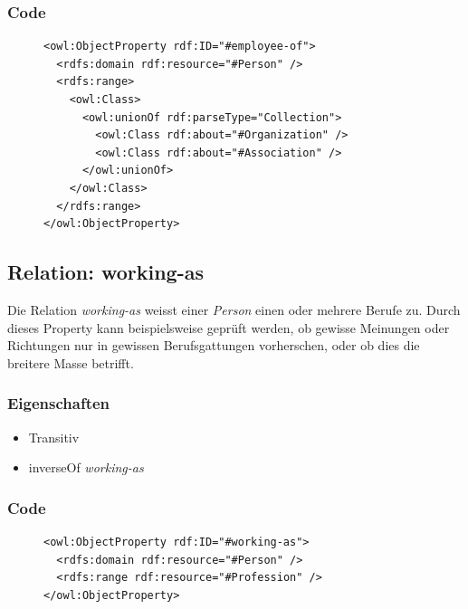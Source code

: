 \documentclass[
    11pt,
    latin1,
    a4paper,
    oneside
]{scrreprt}
\begin{document}
\subsubsection{Code} \label{sec:rel_employeeof_code}

\begin{figure}[H]
 \lstset{language=XML}
 \begin{lstlisting}[label=owl:employeeof,caption={Die Relation \emph{employee-of} gibt an, bei welcher \emph{Organization} oder \emph{Association} die Person angestellt ist}]
<owl:ObjectProperty rdf:ID="#employee-of">
  <rdfs:domain rdf:resource="#Person" />
  <rdfs:range>
    <owl:Class>
      <owl:unionOf rdf:parseType="Collection">
        <owl:Class rdf:about="#Organization" />
        <owl:Class rdf:about="#Association" />
      </owl:unionOf>
    </owl:Class>
  </rdfs:range>
</owl:ObjectProperty>
 \end{lstlisting}
\end{figure}


\subsection{Relation: working-as} \label{sec:rel_workingas}

Die Relation \emph{working-as} weisst einer \emph{Person} einen oder mehrere Berufe zu. Durch dieses Property kann beispielsweise gepr\"uft werden, ob gewisse Meinungen oder Richtungen nur in gewissen Berufsgattungen vorherschen, oder ob dies die breitere Masse betrifft.

\subsubsection{Eigenschaften} \label{sec:rel_workingas_settings}

\begin{itemize}
  \item Transitiv
  \item inverseOf \emph{working-as}
\end{itemize}

\subsubsection{Code} \label{sec:rel_workingas_code}

\begin{figure}[H]
 \lstset{language=XML}
 \begin{lstlisting}[label=owl:workingas,caption={Die Relation \emph{working-as} gibt an, welchen Beruf eine Person aus\"ubt}]
<owl:ObjectProperty rdf:ID="#working-as">
  <rdfs:domain rdf:resource="#Person" />
  <rdfs:range rdf:resource="#Profession" />
</owl:ObjectProperty>
 \end{lstlisting}
\end{figure}
\end{document}
